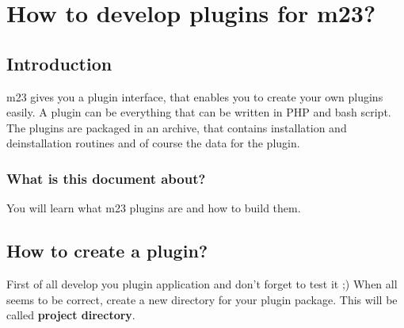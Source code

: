 \section{How to develop plugins for m23?}
\subsection{Introduction}
m23 gives you a plugin interface, that enables you to create your own plugins easily. A plugin can be everything that can be written in PHP and bash script. The plugins are packaged in an archive, that contains installation and deinstallation routines and of course the data for the plugin.

\subsubsection{What is this document about?}
You will learn what m23 plugins are and how to build them.

\subsection{How to create a plugin?}
First of all develop you plugin application and don't forget to test it ;) When all seems to be correct, create a new directory for your plugin package. This will be called \textbf{project directory}. 

